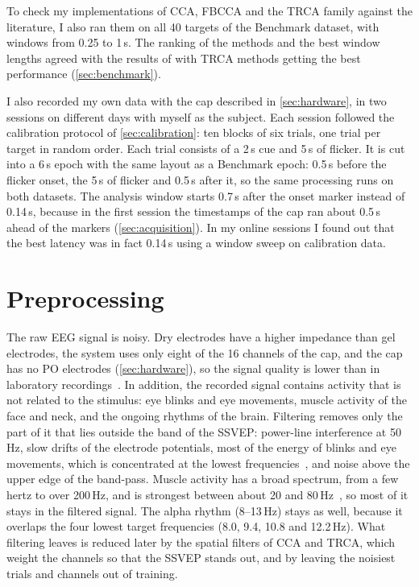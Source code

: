To check my implementations of \ac{CCA}, \ac{FBCCA} and the \ac{TRCA} family against the
literature, I also ran them on all 40 targets of the Benchmark dataset, with windows from
0.25 to 1\,s. The ranking of the methods and the best window lengths agreed with the results 
of \citet{nakanishi2018trca} with TRCA methods getting the best performance (\cref{sec:benchmark}).

I also recorded my own data with the cap described in \cref{sec:hardware}, in two sessions
on different days with myself as the subject. Each session followed the calibration protocol
of \cref{sec:calibration}: ten blocks of six trials, one trial per target in random order.
Each trial consists of a 2\,s cue and 5\,s of flicker. It is cut into a 6\,s epoch with the
same layout as a Benchmark epoch: 0.5\,s before the flicker onset, the 5\,s of flicker and
0.5\,s after it, so the same processing runs on both datasets. The analysis window starts
0.7\,s after the onset marker instead of 0.14\,s, because in the first session the timestamps
of the cap ran about 0.5\,s ahead of the markers (\cref{sec:acquisition}). In my online sessions 
I found out that the best latency was in fact 0.14\,s using a window sweep on calibration data.

\section{Preprocessing}
\label{sec:preprocessing}

The raw \ac{EEG} signal is noisy. Dry electrodes have a higher impedance than gel electrodes,
the system uses only eight of the 16 channels of the cap, and the cap has no PO electrodes
(\cref{sec:hardware}), so the signal quality is lower than
in laboratory recordings~\citep{mathewson2017dry}. In addition, the recorded signal contains
activity that is not related to the stimulus: eye blinks and eye movements, muscle activity
of the face and neck, and the ongoing rhythms of the brain. Filtering removes only the part
of it that lies outside the band of the \ac{SSVEP}: power-line interference at 50\,Hz, slow
drifts of the electrode potentials, most of the energy of blinks and eye movements, which is
concentrated at the lowest frequencies~\citep{gasser1985eog}, and noise
above the upper edge of the band-pass.
Muscle activity has a broad spectrum, from a few hertz to over 200\,Hz, and is strongest
between about 20 and 80\,Hz~\citep{goncharova2003emg}, so most of it stays in the filtered
signal. The alpha rhythm (8--13\,Hz) stays as well, because it overlaps the four lowest
target frequencies (8.0, 9.4, 10.8 and 12.2\,Hz). What filtering leaves is reduced later by
the spatial filters of \ac{CCA} and \ac{TRCA}, which weight the channels so that the
\ac{SSVEP} stands out, and by leaving the noisiest trials and channels out of training.

